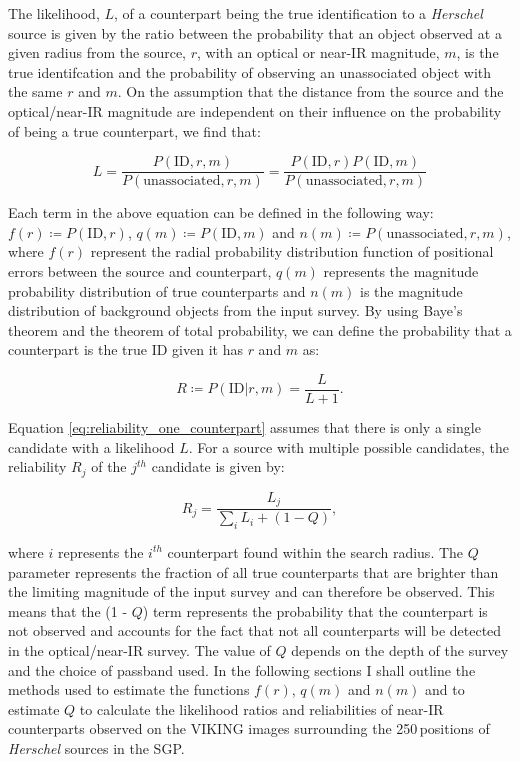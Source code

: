 The likelihood, $L$, of a counterpart being the true identification to a \textit{Herschel} source is given by the ratio between the probability that an object observed at a given radius from the source, $r$, with an optical or near-IR magnitude, $m$, is the true identifcation and the probability of observing an unassociated object with the same $r$ and $m$. On the assumption that the distance from the source and the optical/near-IR magnitude are independent on their influence on the probability of being a true counterpart, we find that:

\begin{equation}
\label{eq:likelihood_ratio}
    L = \frac{P(\textrm{ID}, r, m)}{P(\textrm{unassociated}, r, m)} = \frac{P(\textrm{ID}, r) P(\textrm{ID}, m)}{P(\textrm{unassociated}, r, m)}
\end{equation}

Each term in the above equation can be defined in the following way: $f(r) \coloneqq P(\textrm{ID}, r)$, $q(m) \coloneqq P(\textrm{ID}, m)$ and $n(m) \coloneqq P(\textrm{unassociated}, r, m)$, where $f(r)$ represent the radial probability distribution function of positional errors between the source and counterpart, $q(m)$ represents the magnitude probability distribution of true counterparts and $n(m)$ is the magnitude distribution of background objects from the input survey. By using Baye's theorem and the theorem of total probability, we can define the probability that a counterpart is the true ID given it has $r$ and $m$ as:

\begin{equation}
\label{eq:reliability_one_counterpart}
    R \coloneqq P(\textrm{ID}| r, m) = \frac{L}{L+1}.
\end{equation}

Equation \ref{eq:reliability_one_counterpart} assumes that there is only a single candidate with a likelihood $L$. For a source with multiple possible candidates, the reliability $R_j$ of the $j^{th}$ candidate is given by:

\begin{equation}
    \label{eq:reliability_multiple_counterparts}
        R_j = \frac{L_j}{\sum_i L_i + (1-Q)},
\end{equation}

where $i$ represents the $i^{th}$ counterpart found within the search radius. The $Q$ parameter represents the fraction of all true counterparts that are brighter than the limiting magnitude of the input survey and can therefore be observed. This means that the (1 - $Q$) term represents the probability that the counterpart is not observed and accounts for the fact that not all counterparts will be detected in the optical/near-IR survey. The value of $Q$ depends on the depth of the survey and the choice of passband used. In the following sections I shall outline the methods used to estimate the functions $f(r)$, $q(m)$ and $n(m)$ and to estimate $Q$ to calculate the likelihood ratios and reliabilities of near-IR counterparts observed on the VIKING images surrounding the 250\,\micron positions of \textit{Herschel} sources in the SGP.

